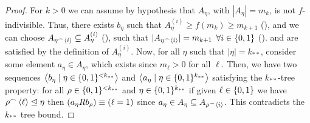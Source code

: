 \begin{lemma}[Claim 4.3]
\begin{proof}
            For $k > 0$ we can assume by hypothesis that $A_\eta$, with $|A_\eta| = m_{k}$, is not $f$-indivisible.
            Thus, there exists $b_\eta$ such that $A_\eta^{(i)} \geq f(m_{k}) \geq m_{k+1}$ (), and we can choose
            $A_{\eta^\frown \left< i \right>} \subseteq A_\eta^{(i)}$ (), such that
            $|A_{\eta^\frown \left< i \right>}| = m_{k+1}$ $\forall i \in \{ 0,1 \}$ ().
             and  are satisfied by the definition of $A_\eta^{(i)}$.
            Now, for all $\eta$ such that $|\eta| = k_{**}$, consider some element $a_\eta \in A_\eta$, which exists since $m_\ell > 0$
            for all $\ell$.
            Then, we have two sequences $\left< b_\eta \mid \eta \in \{ 0,1 \}^{<k_{**}} \right>$ and $\left< a_\eta \mid \eta \in \{ 0,1 \}^{k_{**}} \right>$
            satisfying the $k_{**}$-tree property: for all $\rho \in \{ 0,1 \}^{<k_{**}}$ and $\eta \in \{ 0,1 \}^{k_{**}}$
            if given $\ell \in \{ 0, 1 \}$ we have $\rho^\frown \left< \ell \right> \trianglelefteq \eta$ then
            $(a_\eta R b_\rho) \equiv ( \ell = 1 )$ since $a_\eta \in A_\eta \subseteq A_{\rho ^\frown \left< i \right>}$.
            This contradicts the $k_{**}$ tree bound.
        \end{proof}
    \end{lemma}

